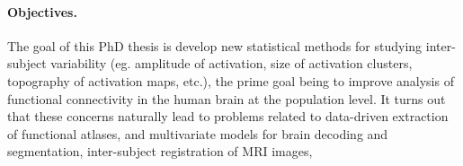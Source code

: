 \paragraph{Objectives.} The goal of this PhD thesis is develop new statistical methods for studying inter-subject variability (eg. amplitude of activation, size of activation clusters, topography of activation maps, etc.), the prime goal being to improve analysis of functional connectivity in the human brain at the population level. It turns out that these concerns naturally lead to problems related to data-driven
extraction of functional atlases, and multivariate models for brain decoding and segmentation, inter-subject registration of MRI images,




